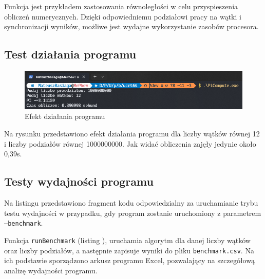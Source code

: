Funkcja jest przykładem zastosowania równoległości w celu przyspieszenia obliczeń numerycznych. Dzięki odpowiedniemu podziałowi pracy na wątki i synchronizacji wyników, możliwe jest wydajne wykorzystanie zasobów procesora.

\newpage

\subsection{Test działania programu}

\begin{figure}[!htb]
  \begin{center}
    \includegraphics[width=\textwidth]{rys/program_example.png}
    \caption{Efekt działania programu}
    \label{rys:program_example}
  \end{center}
\end{figure}

Na rysunku  przedstawiono efekt działania programu dla liczby wątków równej 12 i liczby podziałów równej 1000000000.
Jak widać obliczenia zajęły jedynie około 0,39s.

\subsection{Testy wydajności programu}



Na listingu  przedstawiono fragment kodu odpowiedzialny za uruchamianie trybu testu wydajności w przypadku,
gdy program zostanie uruchomiony z parametrem \texttt{--benchmark}.

\newpage



Funkcja \texttt{runBenchmark} (listing ), uruchamia algorytm dla danej liczby wątków oraz liczby podziałów, a następnie zapisuje wyniki do pliku \texttt{benchmark.csv}.
Na ich podstawie sporządzono arkusz programu Excel, pozwalający na szczegółową analizę wydajności programu.


